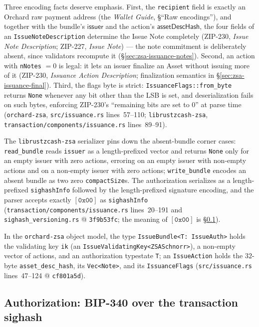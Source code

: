 \documentclass[11pt,a4paper]{article}
\theoremstyle{definition}
\begin{document}
Three encoding facts deserve emphasis. First, the \texttt{recipient}
field is exactly an Orchard raw payment address (the \emph{Wallet Guide},
\S``Raw encodings''), and together with the bundle's $\mathsf{issuer}$
and the action's $\mathsf{assetDescHash}$, the four fields of an
\texttt{IssueNoteDescription} determine the Issue Note completely
(ZIP-230, \emph{Issue Note Description}; ZIP-227, \emph{Issue Note}) ---
the note commitment is deliberately absent, since validators recompute it
(\S\ref{sec:zsa-issuance-notes}). Second, an action with
\texttt{nNotes} $= 0$ is legal: it lets an issuer finalize an Asset
without issuing more of it (ZIP-230, \emph{Issuance Action Description};
finalization semantics in \S\ref{sec:zsa-issuance-final}). Third, the
flags byte is strict: \texttt{IssuanceFlags::from\_byte} returns
\texttt{None} whenever any bit other than the LSB is set, and
deserialization fails on such bytes, enforcing ZIP-230's ``remaining bits
are set to 0'' at parse time (\texttt{orchard-zsa},
\texttt{src/issuance.rs} lines~57--110; \texttt{librustzcash-zsa},
\texttt{transaction/components/issuance.rs} lines~89--91).

The \texttt{librustzcash-zsa} serializer pins down the absent-bundle
corner cases: \texttt{read\_bundle} reads \texttt{issuer} as a
length-prefixed vector and returns \texttt{None} only for an empty issuer
with zero actions, erroring on an empty issuer with non-empty actions and
on a non-empty issuer with zero actions; \texttt{write\_bundle} encodes
an absent bundle as two zero \texttt{compactSize}s. The authorization
serializes as a length-prefixed \texttt{sighashInfo} followed by the
length-prefixed signature encoding, and the parser accepts exactly
$[\mathtt{0x00}]$ as \texttt{sighashInfo}
(\texttt{transaction/components/issuance.rs} lines~20--191 and
\texttt{sighash\_versioning.rs} @ \texttt{3f9b53fc}; the meaning of
$[\mathtt{0x00}]$ is \S\ref{sec:zsa-issuance-auth}).

In the \texttt{orchard-zsa} object model, the type
\texttt{IssueBundle<T: IssueAuth>} holds the validating key
\texttt{ik} (an \texttt{IssueValidatingKey<ZSASchnorr>}), a non-empty
vector of actions, and an authorization typestate \texttt{T}; an
\texttt{IssueAction} holds the $32$-byte \texttt{asset\_desc\_hash},
its \texttt{Vec<Note>}, and its \texttt{IssuanceFlags}
(\texttt{src/issuance.rs} lines~47--124 @ \texttt{cf801a5d}).

\subsection{Authorization: BIP-340 over the transaction sighash}%
\label{sec:zsa-issuance-auth}
\end{document}
